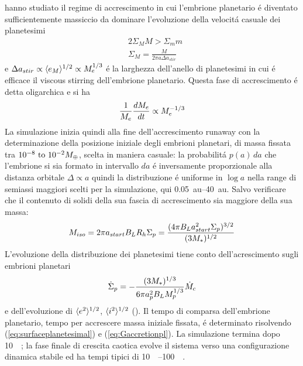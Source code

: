 \cite{ida1993scattering} hanno studiato il regime di accrescimento in cui l'embrione planetario \'e diventato sufficientemente massiccio da dominare l'evoluzione della velocit\'a casuale dei planetesimi
\begin{align}
&2\Sigma_MM>\Sigma_mm\\
&\Sigma_M=\frac{M}{2\pi a\Delta a_{stir}}
\end{align}
e $\Delta a_{stir}\propto\exv{e_M}\expy{1/2}\propto M_e\expy{1/3}$ \'e la larghezza dell'anello di planetesimi in cui \'e efficace il viscous stirring dell'embrione planetario. Questa fase di accrescimento \'e detta oligarchica e si ha
\begin{equation}
\frac{1}{M_e}\TDy{t}{M_e}\propto M_e\expy{-1/3}\label{eq:oligarchicaccretion}
\end{equation}
La simulazione inizia quindi alla fine dell'accrescimento runaway con la determinazione della posizione iniziale degli embrioni planetari, di massa fissata tra $\numrange{e-8}{e-2}\mearth$, scelta in maniera casuale: la probabilit\'a $p(a)\,da$ che l'embrione si sia formato in intervallo $da$ \'e inversamente proporzionale alla distanza orbitale $\Delta\propto a$ quindi la distribuzione \'e uniforme in $\log{a}$ nella range di semiassi maggiori scelti per la simulazione, qui \SIrange{0.05}{40}{\astronomicalunit}. Salvo verificare che il contenuto di solidi della sua fascia di accrescimento sia maggiore della sua massa:
\begin{equation}
M_{iso}=2\pi a_{start}B_LR_h\Sigma_p=\frac{(4\pi B_La_{start}^2\Sigma_p)\expy{3/2}}{(3M_*)\expy{1/2}}
\end{equation}
L'evoluzione della distribuzione dei planetesimi tiene conto dell'acrescimento sugli embrioni planetari
\begin{equation}
\dot{\Sigma}_p=-\frac{(3M_*)\expy{1/3}}{6\pi a_p^2B_LM_p\expy{1/3}}\dot{M}_c\label{eq:surfaceplanetesimal}
\end{equation}
e dell'evoluzione di $\exv{e^2}\expy{1/2}$, $\exv{i^2}\expy{1/2}$ (\cite{fortier2013planet}).
Il tempo di comparsa dell'embrione planetario, tempo per accrescere massa iniziale fissata, \'e determinato risolvendo (\ref{eq:surfaceplanetesimal}) e (\ref{eq:Gaccretionpl}).
La simulazione termina dopo \SI{10}{\mega\year}; la fase finale di crescita caotica evolve il sistema verso una configurazione dinamica stabile ed ha tempi tipici di \SIrange{10}{100}{\mega\year}.

